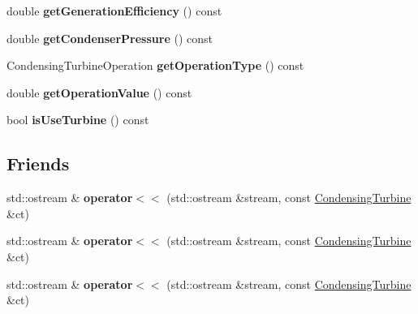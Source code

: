 \begin{DoxyCompactItemize}
\mbox{\label{class_condensing_turbine_a76c3f6edd970f5cde5fdfca90a9b657c}} 
double {\bfseries get\+Generation\+Efficiency} () const
\item 
\mbox{\label{class_condensing_turbine_a318c217b329e9752e3316545595b25bd}} 
double {\bfseries get\+Condenser\+Pressure} () const
\item 
\mbox{\label{class_condensing_turbine_a2d6f79f0c23dd2a69dd606a031d62093}} 
Condensing\+Turbine\+Operation {\bfseries get\+Operation\+Type} () const
\item 
\mbox{\label{class_condensing_turbine_a2d4208cf1204e75b9aa3d9f10478a263}} 
double {\bfseries get\+Operation\+Value} () const
\item 
\mbox{\label{class_condensing_turbine_ae29c56a2fc4c8833f8a244b19d886fd4}} 
bool {\bfseries is\+Use\+Turbine} () const
\end{DoxyCompactItemize}
\subsection*{Friends}
\begin{DoxyCompactItemize}
\item 
\mbox{\label{class_condensing_turbine_aaa0a4cfa03d2288b6e980babe5cab6f6}} 
std\+::ostream \& {\bfseries operator$<$$<$} (std\+::ostream \&stream, const \hyperlink{class_condensing_turbine}{Condensing\+Turbine} \&ct)
\item 
\mbox{\label{class_condensing_turbine_aaa0a4cfa03d2288b6e980babe5cab6f6}} 
std\+::ostream \& {\bfseries operator$<$$<$} (std\+::ostream \&stream, const \hyperlink{class_condensing_turbine}{Condensing\+Turbine} \&ct)
\item 
\mbox{\label{class_condensing_turbine_aaa0a4cfa03d2288b6e980babe5cab6f6}} 
std\+::ostream \& {\bfseries operator$<$$<$} (std\+::ostream \&stream, const \hyperlink{class_condensing_turbine}{Condensing\+Turbine} \&ct)
\end{DoxyCompactItemize}


